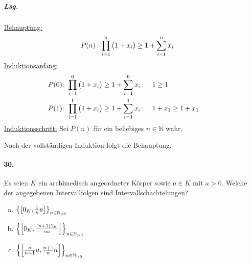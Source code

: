 \documentclass{scrreprt}
\begin{document}
\subparagraph{Lsg.}
\underline{Behauptung:}
\[
  P(n) \colon \prod_{i = 1}^n \qty\big(1 + x_i) \geq 1 + \sum_{i = 1}^n x_i
\]
\underline{Induktionsanfang:}
\begin{align*}
  P(0) &\colon \prod_{i = 1}^0 \qty\big(1 + x_i) \geq 1 + \sum_{i = 1}^0 x_i
       \colon && 1 \geq 1 && \\
  P(1) &\colon \prod_{i = 1}^1 \qty\big(1 + x_i) \geq 1 + \sum_{i = 1}^1 x_i
       \colon && 1 + x_1 \geq 1 + x_1
\end{align*}
\underline{Induktionsschritt:} Sei $P(n)$ für ein beliebiges $n \in \mathbb{N}$
wahr.

Nach der vollständigen Induktion folgt die Behauptung.

\paragraph{30.} Es seien $K$ ein archimedisch angeordneter Körper sowie
$a \in K$ mit $a > 0$.
Welche der angegebenen Intervallfolgen sind Intervallschachtelungen?
\begin{enumerate}[(a)]
\item $\qty{\qty[0_K, \frac{1}{n}a]}_{n \in \mathbb{N}_{>0}}$
\item $\qty{\qty[0_K, \frac{(n + 1) 1_K}{na}]}_{n \in \mathbb{N}_{>0}}$
\item $\qty{\qty[\frac{n}{n + 1}a, \frac{n + 1}{n} a]}_{n \in \mathbb{N}_{>0}}$
\end{enumerate}
\end{document}
